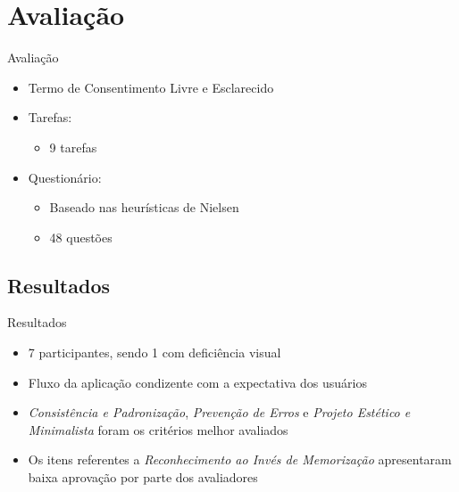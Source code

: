 \section{Avaliação}\label{sec:avaliacao}
\begin{frame}{Avaliação}
	\begin{itemize}
		\setlength{\itemsep}{1em}
		\item<1-> Termo de Consentimento Livre e Esclarecido
		\item<1-> Tarefas:
		\begin{itemize}
			\setlength{\itemsep}{0.5em}
			\item<1-> 9 tarefas
		\end{itemize}
		\item<1-> Questionário:
		\begin{itemize}
			\setlength{\itemsep}{0.5em}
			\item<1-> Baseado nas heurísticas de Nielsen
			\item<1-> 48 questões
		\end{itemize}
	\end{itemize}	
\end{frame}

\subsection{Resultados}
\begin{frame}{Resultados}
	\begin{itemize}
		\setlength{\itemsep}{1em}
		\item<1-> 7 participantes, sendo 1 com deficiência visual	
		\item<1-> Fluxo da aplicação condizente com a expectativa dos usuários 
		\item<1-> \textit{Consistência e Padronização}, \textit{Prevenção de Erros} e \textit{Projeto Estético e Minimalista} foram os critérios melhor avaliados
		\item<1-> Os itens referentes a \textit{Reconhecimento ao Invés de Memorização} apresentaram baixa aprovação por parte dos avaliadores
	\end{itemize}
\end{frame}

